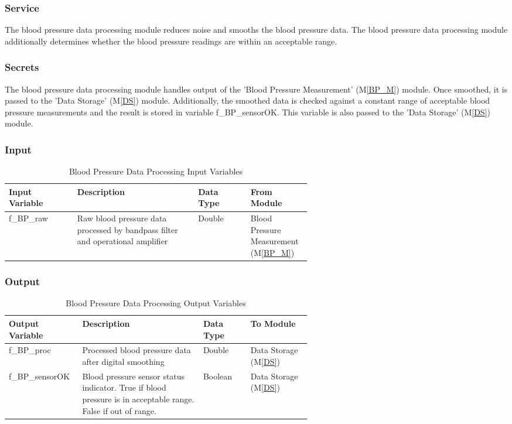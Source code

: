 \documentclass{article}
\begin{document}
\begin{description}
        \subsubsection{Service}
        The blood pressure data processing module reduces noise and smooths the blood pressure data. The blood pressure data processing module additionally determines whether the blood pressure readings are within an acceptable range.
        
        \subsubsection{Secrets}
        The blood pressure data processing module handles output of the 'Blood Pressure Measurement' (M\ref{BP_M}) module.  Once smoothed, it is passed to the 'Data Storage' (M\ref{DS}) module.  Additionally, the smoothed data is checked against a constant range of acceptable blood pressure measurements and the result is stored in variable f\_BP\_sensorOK.  This variable is also passed to the 'Data Storage' (M\ref{DS}) module.
        
        \subsubsection{Input}
            \begin{longtable}{|l|p{0.4\linewidth}|l|p{0.2\linewidth}|}
            \caption{Blood Pressure Data Processing Input Variables}
            \hline
            \textbf{Input Variable} & \textbf{Description} & \textbf {Data Type} & \textbf{From Module} \\
            \endhead
            \hline
            f\_BP\_raw & Raw blood pressure data processed by bandpass filter and operational amplifier & Double & Blood Pressure Measurement (M\ref{BP_M}) \\
            \hline
            \end{longtable}
        \newpage
        \subsubsection{Output}
            \begin{longtable}{|l|p{0.4\linewidth}|l|p{0.2\linewidth}|}
            \caption{Blood Pressure Data Processing Output Variables}
            \hline
            \textbf{Output Variable} & \textbf{Description} & \textbf {Data Type} & \textbf{To Module} \\
            \endhead
            \hline
            f\_BP\_proc & Processed blood pressure data after digital smoothing & Double & Data Storage (M\ref{DS}) \\
            \hline
            f\_BP\_sensorOK & Blood pressure sensor status indicator.  True if blood pressure is in acceptable range.  False if out of range. & Boolean & Data Storage (M\ref{DS}) \\
            \hline
            \end{longtable}

\end{description}
\end{document}
